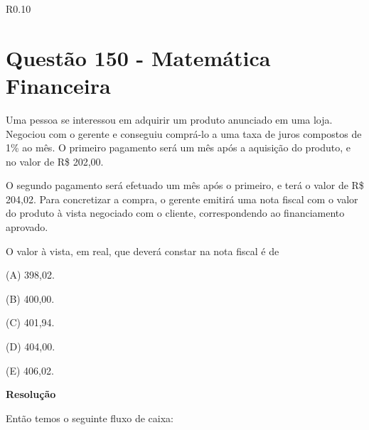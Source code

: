 \begin{wrapfigure}{R}{0.10\textwidth}
    \begin{center}
    \end{center}
\end{wrapfigure}


\section{Questão 150 - Matemática Financeira}

Uma pessoa se interessou em adquirir um produto anunciado em uma loja. Negociou com o gerente e conseguiu comprá-lo a uma taxa de juros compostos de 1\% ao mês. O primeiro pagamento será um mês após a aquisição do produto, e no valor de R\$ 202,00.

O segundo pagamento será efetuado um mês após o primeiro, e terá o valor de R\$ 204,02. Para concretizar a compra, o gerente emitirá uma nota fiscal com o valor do produto à vista negociado com o cliente, correspondendo ao financiamento aprovado.

O valor à vista, em real, que deverá constar na nota fiscal é de

(A) 398,02.

(B) 400,00.

(C) 401,94.

(D) 404,00.

(E) 406,02.

\textbf{Resolução}

Então temos o seguinte fluxo de caixa:

